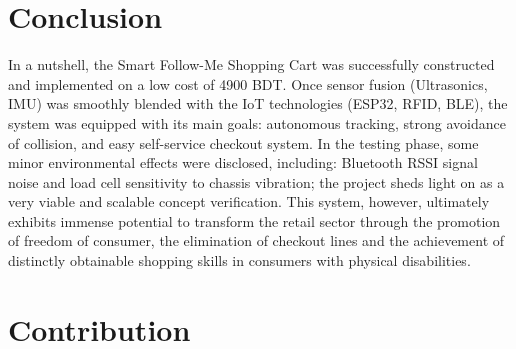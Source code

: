 \documentclass[12pt,a4paper]{article}
\begin{document}
\section{Conclusion}
In a nutshell, the Smart Follow-Me Shopping Cart was successfully constructed and implemented on a low cost of 4900 BDT. Once sensor fusion (Ultrasonics, IMU) was smoothly blended with the IoT technologies (ESP32, RFID, BLE), the system was equipped with its main goals: autonomous tracking, strong avoidance of collision, and easy self-service checkout system. In the testing phase, some minor environmental effects were disclosed, including: Bluetooth RSSI signal noise and load cell sensitivity to chassis vibration; the project sheds light on as a very viable and scalable concept verification. This system, however, ultimately exhibits immense potential to transform the retail sector through the promotion of freedom of consumer, the elimination of checkout lines and the achievement of distinctly obtainable shopping skills in consumers with physical disabilities.

\section{Contribution}
\end{document}
